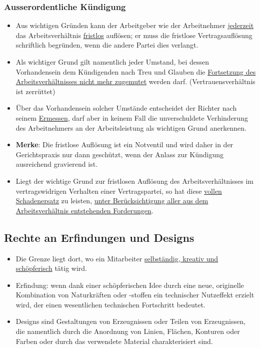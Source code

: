 \subsubsection{Ausserordentliche Kündigung}
\begin{itemize}
    \item Aus wichtigen Gründen kann der Arbeitgeber wie der Arbeitnehmer \underline{jederzeit} das Arbeitsverhältnis \underline{fristlos} auflösen; er muss die fristlose Vertragsauflösung schriftlich begründen, wenn die andere Partei dies verlangt.
    \item Als wichtiger Grund gilt namentlich jeder Umstand, bei dessen Vorhandensein dem Kündigenden nach Treu und Glauben die \underline{Fortsetzung des Arbeitsverhältnisses nicht mehr zugemutet} werden darf. (Vertrauensverhältnis ist zerrüttet)
    \item Über das Vorhandensein solcher Umstände entscheidet der Richter nach seinem \underline{Ermessen}, darf aber in keinem Fall die unverschuldete Verhinderung des Arbeitnehmers an der Arbeitsleistung als wichtigen Grund anerkennen.
    \item \textbf{Merke}: Die fristlose Auflösung ist ein Notventil und wird daher in der Gerichtspraxis nur dann geschützt, wenn der Anlass zur Kündigung ausreichend gravierend ist.
    \item Liegt der wichtige Grund zur fristlosen Auflösung des Arbeitsverhältnisses im vertragswidrigen Verhalten einer Vertragspartei, so hat diese \underline{vollen Schadenersatz} zu leisten, \underline{unter Berücksichtigung aller aus dem Arbeitsverhältnis entstehenden Forderungen}.
\end{itemize}

\subsection{Rechte an Erfindungen und Designs}
\begin{itemize}
    \item Die Grenze liegt dort, wo ein Mitarbeiter \underline{selbständig, kreativ und schöpferisch} tätig wird.
    \item Erfindung: wenn dank einer schöpferischen Idee durch eine neue, originelle Kombination von Naturkräften oder -stoffen ein technischer Nutzeffekt erzielt wird, der einen wesentlichen technischen Fortschritt bedeutet.
    \item Designs sind Gestaltungen von Erzeugnissen oder Teilen von Erzeugnissen, die namentlich durch die Anordnung von Linien, Flächen, Konturen oder Farben oder durch das verwendete Material charakterisiert sind.
\end{itemize}


